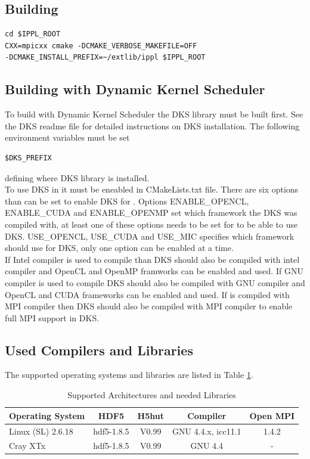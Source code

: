 \subsection{Building \ippl}
\begin{verbatim}
cd $IPPL_ROOT
CXX=mpicxx cmake -DCMAKE_VERBOSE_MAKEFILE=OFF
-DCMAKE_INSTALL_PREFIX=~/extlib/ippl $IPPL_ROOT
\end{verbatim}


\subsection{Building \ippl with Dynamic Kernel Scheduler}
To build \ippl with Dynamic Kernel Scheduler the DKS library must be built first. See the DKS readme file
for detailed instructions on DKS installation. The following environment variables must be set
\begin{verbatim}
$DKS_PREFIX
\end{verbatim}
defining where DKS library is installed.\\
To use DKS in \ippl it must be eneabled in CMakeLists.txt file. There are six options than can be set to
enable DKS for \ippl. Options ENABLE\_OPENCL, ENABLE\_CUDA and ENABLE\_OPENMP set which framework the
DKS  was compiled with, at least one of these options needs to be set for \ippl to be able
to use DKS. USE\_OPENCL, USE\_CUDA and USE\_MIC specifies which framework \ippl should use for DKS, only one
option can be enabled at a time.\\
If Intel compiler is used to compile \ippl than DKS should also be compiled
with intel compiler and OpenCL and OpenMP framworks can be enabled and used. If GNU compiler is used to compile
\ippl DKS should also be compiled with GNU compiler and OpenCL and CUDA frameworks can be enabled and used.
If \ippl is compiled with MPI compiler then DKS should also be compiled with MPI compiler to enable full MPI
support in DKS.


\subsection{Used Compilers and Libraries}
The supported operating systems and libraries are listed in Table \ref{tab:archlib}.
\begin{table}[h]
  \caption{Supported Architectures and needed Libraries}
  \label{tab:archlib}
  \begin{center}
    \begin{tabular}{|lcccc|}
      \hline
      Operating System & HDF5  & H5hut & Compiler & Open MPI\\
      \hline
      Linux (SL) 2.6.18 & hdf5-1.8.5 & V0.99 & GNU 4.4.x, icc11.1 & 1.4.2 \\
      Cray XTx  & hdf5-1.8.5 & V0.99 & GNU 4.4 & - \\
      \hline
    \end{tabular}
  \end{center}
\end{table}





